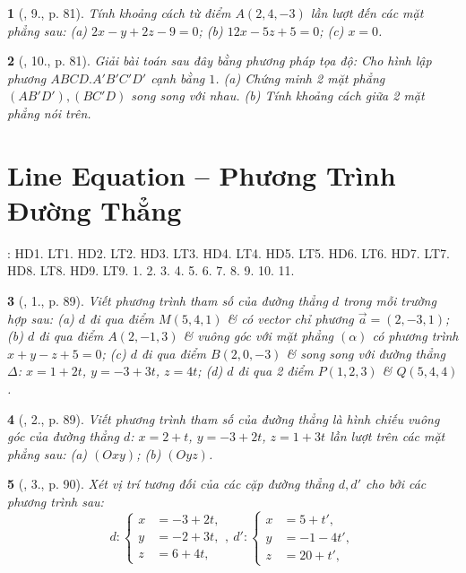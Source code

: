 \documentclass{article}
\newtheorem{baitoan}{}
\begin{document}
\begin{baitoan}[\cite{SGK_Toan_12_hinh_hoc_co_ban}, 9., p. 81]
	Tính khoảng cách từ điểm $A(2,4,-3)$ lần lượt đến các mặt phẳng sau: (a) $2x - y + 2z - 9 = 0$; (b) $12x - 5z + 5 = 0$; (c) $x = 0$.
\end{baitoan}

\begin{baitoan}[\cite{SGK_Toan_12_hinh_hoc_co_ban}, 10., p. 81]
	Giải bài toán sau đây bằng phương pháp tọa độ: Cho hình lập phương $ABCD.A'B'C'D'$ cạnh bằng $1$. (a) Chứng minh 2 mặt phẳng $(AB'D'),(BC'D)$ song song với nhau. (b) Tính khoảng cách giữa 2 mặt phẳng nói trên.
\end{baitoan}


\section{Line Equation -- Phương Trình Đường Thẳng}
\cite[Chap. V, \S2, pp. 65--80]{SGK_Toan_12_Canh_Dieu_tap_2}: HD1. LT1. HD2. LT2. HD3. LT3. HD4. LT4. HD5. LT5. HD6. LT6. HD7. LT7. HD8. LT8. HD9. LT9. 1. 2. 3. 4. 5. 6. 7. 8. 9. 10. 11.

\begin{baitoan}[\cite{SGK_Toan_12_hinh_hoc_co_ban}, 1., p. 89]
	Viết phương trình tham số của đường thẳng $d$ trong mỗi trường hợp sau: (a) $d$ đi qua điểm $M(5,4,1)$ \& có vector chỉ phương $\vec{a} = (2,-3,1)$; (b) $d$ đi qua điểm $A(2,-1,3)$ \& vuông góc với mặt phẳng $(\alpha)$ có phương trình $x + y - z + 5 = 0$; (c) $d$ đi qua điểm $B(2,0,-3)$ \& song song với đường thẳng $\Delta$: $x = 1 + 2t$, $y = -3 + 3t$, $z = 4t$; (d) $d$ đi qua 2 điểm $P(1,2,3)$ \& $Q(5,4,4)$.
\end{baitoan}

\begin{baitoan}[\cite{SGK_Toan_12_hinh_hoc_co_ban}, 2., p. 89]
	Viết phương trình tham số của đường thẳng là hình chiếu vuông góc của đường thẳng $d$: $x = 2 + t$, $y = -3 + 2t$, $z = 1 + 3t$ lần lượt trên các mặt phẳng sau: (a) $(Oxy)$; (b) $(Oyz)$.
\end{baitoan}

\begin{baitoan}[\cite{SGK_Toan_12_hinh_hoc_co_ban}, 3., p. 90]
	Xét vị trí tương đối của các cặp đường thẳng $d,d'$ cho bởi các phương trình sau:
	\begin{equation*}
		d:\left\{\begin{split}
			x &= -3 + 2t,\\
			y &= -2 + 3t,\\
			z &= 6 + 4t,
		\end{split}\right.,\ d':\left\{\begin{split}
			x &= 5 + t',\\
			y &= -1 - 4t',\\
			z &= 20 + t',
		\end{split}\right.
	\end{equation*}
\end{baitoan}
\end{document}
